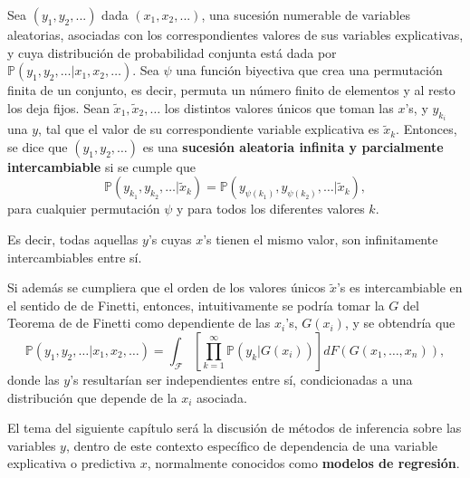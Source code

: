 \begin{defin*}
    Sea $(y_1,y_2,...)$ dada $(x_1,x_2,...)$, una sucesi\'on numerable de variables aleatorias, asociadas con los correspondientes valores de sus variables explicativas, y cuya distribuci\'on de probabilidad conjunta est\'a dada por $\mathbb{P}(y_1,y_2,\ldots|x_1,x_2,\ldots)$. Sea $\psi$ una funci\'on biyectiva que crea una permutaci\'on finita de un conjunto, es decir, permuta un n\'umero finito de elementos y al resto los deja fijos. Sean $\tilde{x}_1,\tilde{x}_2,\ldots$ los distintos valores \'unicos que toman las $x$'s, y $y_{k_i}$ una $y$, tal que el valor de su correspondiente variable explicativa es $\tilde{x}_k$.  
    Entonces, se dice que $(y_1,y_2,\ldots)$ es una \textbf{sucesi\'on aleatoria infinita y parcialmente intercambiable} si se cumple que 
    \begin{equation*}
        \mathbb{P}(y_{k_1},y_{k_2},\ldots|\tilde{x}_k) = \mathbb{P}(y_{\psi(k_1)},y_{\psi(k_2)},\ldots|\tilde{x}_k),
    \end{equation*}
    para cualquier permutaci\'on $\psi$ y para todos los diferentes valores $k$.
    
    Es decir, todas aquellas $y$'s cuyas $x$'s tienen el mismo valor, son infinitamente intercambiables entre s\'i. 
\end{defin*}

Si adem\'as se cumpliera que el orden de los valores \'unicos $\tilde{x}$'s es intercambiable en el sentido de de Finetti, entonces, intuitivamente se podr\'ia tomar la $G$ del Teorema de de Finetti como dependiente de las $x_i$'s, $G(x_i)$, y se obtendr\'ia que
\begin{equation*}
    \mathbb{P}(y_1,y_2,\ldots|x_1,x_2,\ldots) =
    \int_{\mathcal{F}}\left[\prod_{k=1}^\infty \mathbb{P}(y_k|G(x_i))\right]dF(G(x_1,\ldots,x_n)),
\end{equation*}
donde las $y$'s resultar\'ian ser independientes entre s\'i, condicionadas a una distribuci\'on que depende de la $x_i$ asociada.

El tema del siguiente cap\'itulo ser\'a la discusi\'on de m\'etodos de inferencia sobre las variables $y$, dentro de este contexto espec\'ifico de dependencia de una variable explicativa o predictiva $x$, normalmente conocidos como \textbf{modelos de regresi\'on}.

\newpage